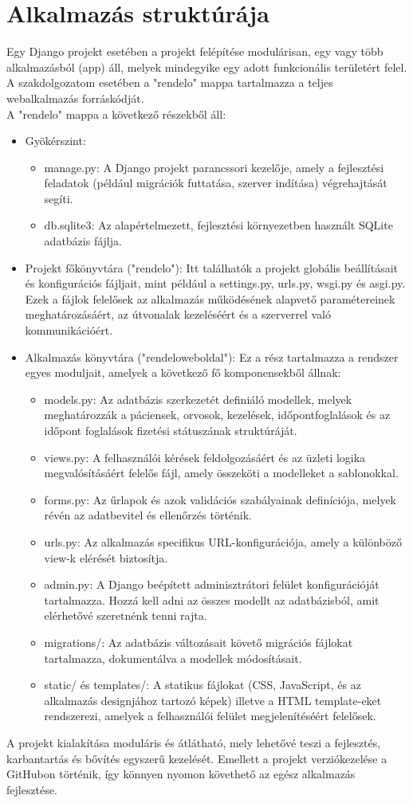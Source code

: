 \chapter{Alkalmazás struktúrája}
\label{chap:fejezet2}

Egy Django projekt esetében a projekt felépítése modulárisan, egy vagy több alkalmazásból (app) áll, melyek mindegyike egy adott funkcionális területért felel. A szakdolgozatom esetében a "rendelo" mappa tartalmazza a teljes webalkalmazás forráskódját.\\
A "rendelo" mappa a következő részekből áll:

\begin{itemize}
	\item Gyökérszint:
	\begin{itemize}
		\item manage.py: A Django projekt parancssori kezelője, amely a fejlesztési feladatok (például migrációk futtatása, szerver indítása) végrehajtását segíti.
		\item db.sqlite3: Az alapértelmezett, fejlesztési környezetben használt SQLite adatbázis fájlja.
	\end{itemize}
	\item Projekt főkönyvtára ("rendelo"): Itt találhatók a projekt globális beállításait és konfigurációs fájljait, mint például a settings.py, urls.py, wsgi.py és asgi.py. Ezek a fájlok felelősek az alkalmazás működésének alapvető paramétereinek meghatározásáért, az útvonalak kezeléséért és a szerverrel való kommunikációért.
	\item Alkalmazás könyvtára ("rendeloweboldal"): Ez a rész tartalmazza a rendszer egyes moduljait, amelyek a következő fő komponensekből állnak:
	\begin{itemize}
		\item models.py: Az adatbázis szerkezetét definiáló modellek, melyek meghatározzák a páciensek, orvosok, kezelések, időpontfoglalások és az időpont foglalások fizetési státuszának struktúráját.
		\item views.py: A felhasználói kérések feldolgozásáért és az üzleti logika megvalósításáért felelős fájl, amely összeköti a modelleket a sablonokkal.
		\item forms.py: Az űrlapok és azok validációs szabályainak definíciója, melyek révén az adatbevitel és ellenőrzés történik.
		\item urls.py: Az alkalmazás specifikus URL-konfigurációja, amely a különböző view-k elérését biztosítja.
		\item admin.py: A Django beépített adminisztrátori felület konfigurációját tartalmazza. Hozzá kell adni az összes modellt az adatbázisból, amit elérhetővé szeretnénk tenni rajta.
		\item migrations/: Az adatbázis változásait követő migrációs fájlokat tartalmazza, dokumentálva a modellek módosításait.
		\item static/ és templates/: A statikus fájlokat (CSS, JavaScript, és az alkalmazás designjához tartozó képek) illetve a HTML template-eket rendszerezi, amelyek a felhasználói felület megjelenítéséért felelősek.
	\end{itemize}
\end{itemize}

A projekt kialakítása moduláris és átlátható, mely lehetővé teszi a fejlesztés, karbantartás és bővítés egyszerű kezelését.
Emellett a projekt verziókezelése a GitHubon történik, így könnyen nyomon követhető az egész alkalmazás fejlesztése.